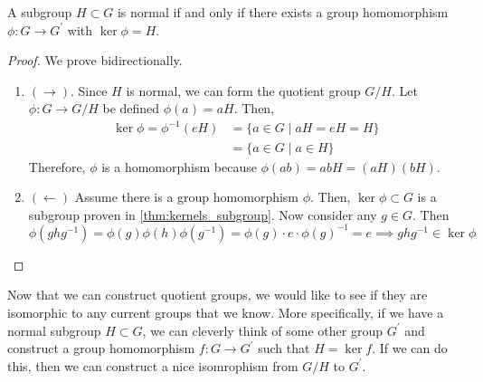   \begin{lemma}
    \label{thm:normal_kernel}
    A subgroup $H \subset G$ is normal if and only if there exists a group homomorphism $\phi: G \rightarrow G^\prime$ with $\ker{\phi} = H$. 
  \end{lemma}
  \begin{proof}
    We prove bidirectionally. 
    \begin{enumerate}
      \item $(\rightarrow)$. Since $H$ is normal, we can form the quotient group $G/H$. Let $\phi: G \rightarrow G/H$ be defined $\phi(a) = aH$. Then, 
      \begin{align}
        \ker{\phi} = \phi^{-1}(eH) & = \{a \in G \mid aH = eH = H \} \\
                                   & = \{a \in G \mid a \in H \}
      \end{align}
      Therefore, $\phi$ is a homomorphism because $\phi(ab) = abH = (aH)(bH)$.   

      \item $(\leftarrow)$ Assume there is a group homomorphism $\phi$. Then, $\ker{\phi} \subset G$ is a subgroup proven in \ref{thm:kernels_subgroup}. Now consider any $g \in G$. Then 
      \begin{equation}
        \phi(g h g^{-1}) = \phi(g) \phi(h) \phi(g^{-1}) = \phi(g) \cdot e \cdot \phi(g)^{-1} = e \implies g h g^{-1} \in \ker{\phi}
      \end{equation}
    \end{enumerate}
  \end{proof}

  Now that we can construct quotient groups, we would like to see if they are isomorphic to any current groups that we know. More specifically, if we have a normal subgroup $H \subset G$, we can cleverly think of some other group $G^\prime$ and construct a group homomorphism $f: G \to G^\prime$ such that $H = \ker{f}$. If we can do this, then we can construct a nice isomrophism from $G/H$ to $G^\prime$. 

